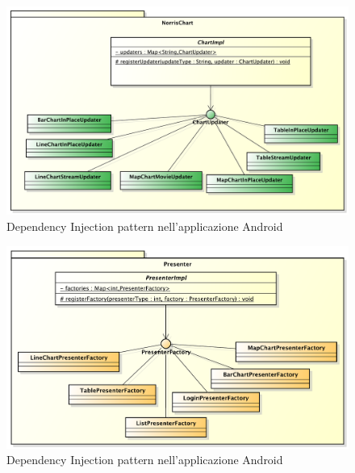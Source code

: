 	    		\begin{figure}[H]\centering
	        		\includegraphics[width=\textwidth]{SpecificaTecnica/Pics/DesignPatternNorris/DependencyInjection1}
	        		\caption{Dependency Injection pattern nell'applicazione Android}
	    		\end{figure}
                \begin{figure}[H]\centering
	        		\includegraphics[width=\textwidth]{SpecificaTecnica/Pics/DesignPatternApp/DependencyInjection}
	        		\caption{Dependency Injection pattern nell'applicazione Android}
	    		\end{figure}

